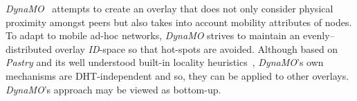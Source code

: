 % 
% 

\emph{DynaMO}~\cite{WZS2004} attempts to create an overlay that 
does not only consider physical proximity amongst peers but also
takes into account mobility attributes of nodes.
To adapt to mobile ad-hoc networks, \emph{DynaMO} strives
to maintain an evenly--distributed overlay \emph{ID}-space 
so that hot-spots are avoided. 
Although based on \emph{Pastry} and 
its well understood built-in locality heuristics~\cite{CDCR2002a},
\emph{DynaMO}'s own mechanisms are {DHT}-independent and 
so, they can be applied to other overlays.
\emph{DynaMO}'s approach may be viewed as bottom-up. 

